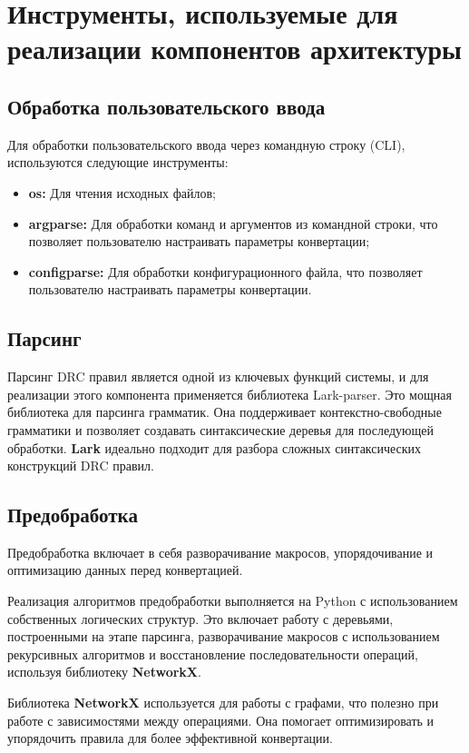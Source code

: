 \section{Инструменты, используемые для реализации компонентов архитектуры}

\subsection{Обработка пользовательского ввода}

Для обработки пользовательского ввода
через командную строку (CLI), используются следующие инструменты:

\begin{itemize}
	\item \textbf{os:} Для чтения исходных файлов;
	\item \textbf{argparse:} Для обработки команд
		и аргументов из командной строки,
		что позволяет пользователю настраивать параметры конвертации;
	\item \textbf{configparse:} Для обработки конфигурационного файла,
		что позволяет пользователю настраивать параметры конвертации.
\end{itemize}

\subsection{Парсинг}

Парсинг DRC правил является одной из ключевых функций системы,
и для реализации этого компонента применяется библиотека Lark-parser.
Это мощная библиотека для парсинга грамматик.
Она поддерживает контекстно-свободные грамматики
и позволяет создавать синтаксические деревья для последующей обработки.
\textbf{Lark} идеально подходит для разбора
сложных синтаксических конструкций DRC правил.

\subsection{Предобработка}

Предобработка включает в себя разворачивание макросов,
упорядочивание и оптимизацию данных перед конвертацией.\par
Реализация алгоритмов предобработки выполняется на Python
с использованием собственных логических структур.
Это включает работу с деревьями, построенными на этапе парсинга,
разворачивание макросов с использованием рекурсивных алгоритмов
и восстановление последовательности операций,
используя библиотеку \textbf{NetworkX}.\par
Библиотека \textbf{NetworkX} используется для работы с графами,
что полезно при работе с зависимостями между операциями.
Она помогает оптимизировать и упорядочить правила
для более эффективной конвертации.

